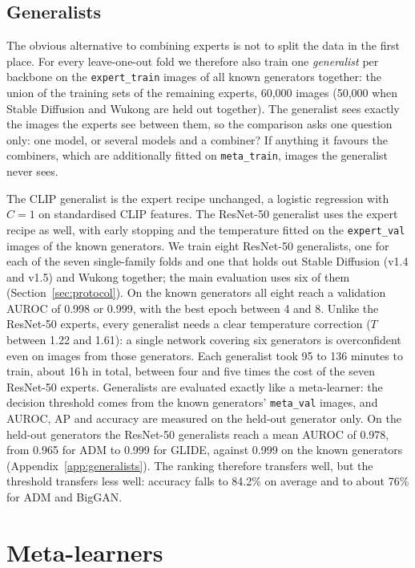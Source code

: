 \documentclass[10pt,a4paper]{article}
\begin{document}
\subsection{Generalists}\label{sec:generalists}

The obvious alternative to combining experts is not to split the data in the first place. For every leave-one-out fold we therefore also train one \emph{generalist} per backbone on the \texttt{expert\_train} images of all known generators together: the union of the training sets of the remaining experts, 60,000 images (50,000 when Stable Diffusion and Wukong are held out together). The generalist sees exactly the images the experts see between them, so the comparison asks one question only: one model, or several models and a combiner? If anything it favours the combiners, which are additionally fitted on \texttt{meta\_train}, images the generalist never sees.

The CLIP generalist is the expert recipe unchanged, a logistic regression with $C=1$ on standardised CLIP features. The ResNet-50 generalist uses the expert recipe as well, with early stopping and the temperature fitted on the \texttt{expert\_val} images of the known generators. We train eight ResNet-50 generalists, one for each of the seven single-family folds and one that holds out Stable Diffusion (v1.4 and v1.5) and Wukong together; the main evaluation uses six of them (Section~\ref{sec:protocol}). On the known generators all eight reach a validation AUROC of 0.998 or 0.999, with the best epoch between 4 and 8. Unlike the ResNet-50 experts, every generalist needs a clear temperature correction ($T$ between 1.22 and 1.61): a single network covering six generators is overconfident even on images from those generators. Each generalist took 95 to 136 minutes to train, about 16\,h in total, between four and five times the cost of the seven ResNet-50 experts. Generalists are evaluated exactly like a meta-learner: the decision threshold comes from the known generators' \texttt{meta\_val} images, and AUROC, AP and accuracy are measured on the held-out generator only. On the held-out generators the ResNet-50 generalists reach a mean AUROC of 0.978, from 0.965 for ADM to 0.999 for GLIDE, against 0.999 on the known generators (Appendix~\ref{app:generalists}). The ranking therefore transfers well, but the threshold transfers less well: accuracy falls to 84.2\% on average and to about 76\% for ADM and BigGAN.

\section{Meta-learners}\label{sec:meta}
\end{document}
